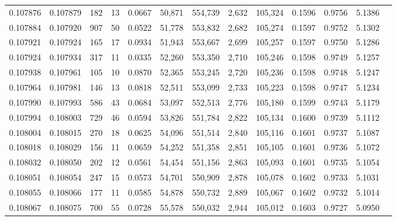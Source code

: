 \begin{tabular}{rrrrrrrrrrrrr}
0.107876 & 0.107879 &   182 &  13 &                                     0.0667 &  50,871 & 554,739 &   2,632 & 105,324 & 0.1596 & 0.9756 & 5.1386 \\
0.107884 & 0.107920 &   907 &  50 &                                     0.0522 &  51,778 & 553,832 &   2,682 & 105,274 & 0.1597 & 0.9752 & 5.1302 \\
0.107921 & 0.107924 &   165 &  17 &                                     0.0934 &  51,943 & 553,667 &   2,699 & 105,257 & 0.1597 & 0.9750 & 5.1286 \\
0.107924 & 0.107934 &   317 &  11 &                                     0.0335 &  52,260 & 553,350 &   2,710 & 105,246 & 0.1598 & 0.9749 & 5.1257 \\
0.107938 & 0.107961 &   105 &  10 &                                     0.0870 &  52,365 & 553,245 &   2,720 & 105,236 & 0.1598 & 0.9748 & 5.1247 \\
0.107964 & 0.107981 &   146 &  13 &                                     0.0818 &  52,511 & 553,099 &   2,733 & 105,223 & 0.1598 & 0.9747 & 5.1234 \\
0.107990 & 0.107993 &   586 &  43 &                                     0.0684 &  53,097 & 552,513 &   2,776 & 105,180 & 0.1599 & 0.9743 & 5.1179 \\
0.107994 & 0.108003 &   729 &  46 &                                     0.0594 &  53,826 & 551,784 &   2,822 & 105,134 & 0.1600 & 0.9739 & 5.1112 \\
0.108004 & 0.108015 &   270 &  18 &                                     0.0625 &  54,096 & 551,514 &   2,840 & 105,116 & 0.1601 & 0.9737 & 5.1087 \\
0.108018 & 0.108029 &   156 &  11 &                                     0.0659 &  54,252 & 551,358 &   2,851 & 105,105 & 0.1601 & 0.9736 & 5.1072 \\
0.108032 & 0.108050 &   202 &  12 &                                     0.0561 &  54,454 & 551,156 &   2,863 & 105,093 & 0.1601 & 0.9735 & 5.1054 \\
0.108051 & 0.108054 &   247 &  15 &                                     0.0573 &  54,701 & 550,909 &   2,878 & 105,078 & 0.1602 & 0.9733 & 5.1031 \\
0.108055 & 0.108066 &   177 &  11 &                                     0.0585 &  54,878 & 550,732 &   2,889 & 105,067 & 0.1602 & 0.9732 & 5.1014 \\
0.108067 & 0.108075 &   700 &  55 &                                     0.0728 &  55,578 & 550,032 &   2,944 & 105,012 & 0.1603 & 0.9727 & 5.0950 \\

\end{tabular}
